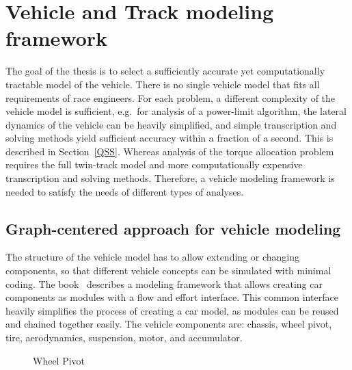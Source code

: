 \chapter{Vehicle and Track modeling framework}
The goal of the thesis is to select a sufficiently accurate yet computationally tractable model of the vehicle.
There is no single vehicle model that fits all requirements of race engineers. For each problem, a different complexity of the vehicle model is sufficient, e.g.\ for analysis of a power-limit algorithm, the lateral dynamics of the vehicle can be heavily simplified, and simple transcription and solving methods yield sufficient accuracy within a fraction of a second. This is described in Section~\ref{QSS}. Whereas analysis of the torque allocation problem requires the full twin-track model and more computationally expensive transcription and solving methods. Therefore, a vehicle modeling framework is needed to satisfy the needs of different types of analyses.

\section{Graph-centered approach for vehicle modeling}
The structure of the vehicle model has to allow extending or changing components, so that different vehicle concepts can be simulated with minimal coding. The book~\cite{brown_engineering_2006} describes a modeling framework that allows creating car components as modules with a flow and effort interface. This common interface heavily simplifies the process of creating a car model, as modules can be reused and chained together easily.
The vehicle components are: chassis, wheel pivot, tire, aerodynamics, suspension, motor, and accumulator.

\begin{figure}[H]
	\centering
	\caption{Wheel Pivot}
	\label{fig:wheel_pivot}
\end{figure}



